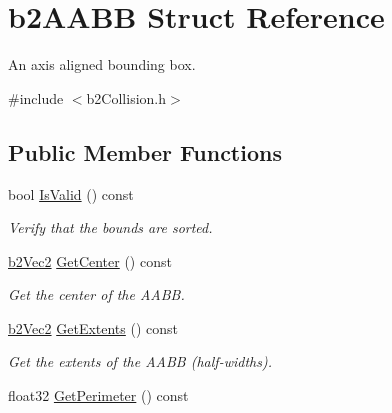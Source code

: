 \hypertarget{structb2_a_a_b_b}{\section{b2\-A\-A\-B\-B Struct Reference}
\label{structb2_a_a_b_b}
}


An axis aligned bounding box.  




{\ttfamily \#include $<$b2\-Collision.\-h$>$}

\subsection*{Public Member Functions}
\begin{DoxyCompactItemize}
\item 
\hypertarget{structb2_a_a_b_b_a8d170a2de7a267c3e19f5365685b713d}{bool \hyperlink{structb2_a_a_b_b_a8d170a2de7a267c3e19f5365685b713d}{Is\-Valid} () const }\label{structb2_a_a_b_b_a8d170a2de7a267c3e19f5365685b713d}

\begin{DoxyCompactList}\small\item\em Verify that the bounds are sorted. \end{DoxyCompactList}\item 
\hypertarget{structb2_a_a_b_b_aa26703e234bd6fb30fd443cd5001795a}{\hyperlink{structb2_vec2}{b2\-Vec2} \hyperlink{structb2_a_a_b_b_aa26703e234bd6fb30fd443cd5001795a}{Get\-Center} () const }\label{structb2_a_a_b_b_aa26703e234bd6fb30fd443cd5001795a}

\begin{DoxyCompactList}\small\item\em Get the center of the A\-A\-B\-B. \end{DoxyCompactList}\item 
\hypertarget{structb2_a_a_b_b_aff8b9aa64069a33fe45025299aa0e9b7}{\hyperlink{structb2_vec2}{b2\-Vec2} \hyperlink{structb2_a_a_b_b_aff8b9aa64069a33fe45025299aa0e9b7}{Get\-Extents} () const }\label{structb2_a_a_b_b_aff8b9aa64069a33fe45025299aa0e9b7}

\begin{DoxyCompactList}\small\item\em Get the extents of the A\-A\-B\-B (half-\/widths). \end{DoxyCompactList}\item 
\hypertarget{structb2_a_a_b_b_ace4448c60ef309726e59247a8ae67db5}{float32 \hyperlink{structb2_a_a_b_b_ace4448c60ef309726e59247a8ae67db5}{Get\-Perimeter} () const }\label{structb2_a_a_b_b_ace4448c60ef309726e59247a8ae67db5}


\end{DoxyCompactItemize}

